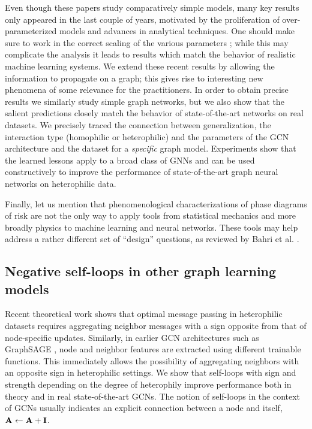 \documentclass[9pt,twocolumn]{pnas-new}
\newcommand{\idd}[1]{{#1}}
\begin{document}
Even though these papers study comparatively simple models, many key results only appeared in the last couple of years, motivated by the proliferation of over-parameterized models and advances in analytical techniques. \idd{One should make sure to work in the correct scaling of the various parameters \cite{liao2020random}; while this may complicate the analysis it leads to results which match the behavior of realistic machine learning systems.} We extend these recent results by allowing the information to propagate on a graph; this gives rise to interesting new phenomena of some relevance for the practitioners. In order to obtain precise results we similarly study simple graph networks, but we also show that the salient predictions closely match the behavior of state-of-the-art networks on real datasets. We precisely traced the connection between generalization, the interaction type (homophilic or heterophilic) and the parameters of the GCN architecture and the dataset for a \textit{specific} graph model. Experiments show that the learned lessons apply to a broad class of GNNs and can be used constructively to improve the performance of state-of-the-art graph neural networks on heterophilic data.

\idd{Finally, let us mention that phenomenological characterizations of phase diagrams of risk are not the only way to apply tools from statistical mechanics and more broadly physics to machine learning and neural networks. These tools may help address a rather different set of ``design'' questions, as reviewed by Bahri et al. \cite{bahri2020statistical}.}



\subsection*{Negative self-loops in other graph learning models}

Recent theoretical work \cite{wei2022understanding,baranwal2023optimality} shows that optimal message passing in heterophilic datasets requires aggregating neighbor messages with a sign opposite from that of node-specific updates. Similarly, in earlier GCN architectures such as GraphSAGE \cite{hamilton2017inductive}, node and neighbor features are extracted using different trainable functions. This immediately allows the possibility of aggregating neighbors with an opposite sign in heterophilic settings. We show that self-loops with sign and strength depending on the degree of heterophily improve performance both in theory and in real state-of-the-art GCNs. The notion of self-loops in the context of GCNs usually indicates an explicit connection between a node and itself, $\mathbf{A} \gets \mathbf{A} + 
\mathbf{I}$.
\end{document}
